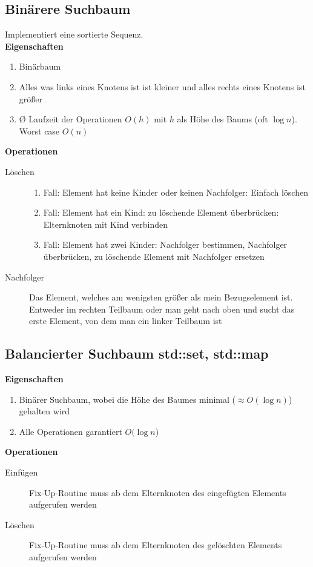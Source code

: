 \subsection{Binärere Suchbaum}
Implementiert eine sortierte Sequenz. \\
\textbf{Eigenschaften}
\begin{enumerate}
    \item Binärbaum
    \item Alles was links eines Knotens ist ist kleiner und alles rechts eines Knotens ist größer
    \item Ø Laufzeit der Operationen $O(h)$ mit $h$ als Höhe des Baums (oft $\log n$). Worst case $O(n)$
\end{enumerate}
\textbf{Operationen}
\begin{description}
    \item[Löschen]
          \begin{enumerate}
              \item Fall: Element hat keine Kinder oder keinen Nachfolger: Einfach löschen
              \item Fall: Element hat ein Kind: zu löschende Element überbrücken: Elternknoten mit Kind verbinden
              \item Fall: Element hat zwei Kinder: Nachfolger bestimmen, Nachfolger überbrücken, zu löschende Element mit Nachfolger ersetzen
          \end{enumerate}
    \item[Nachfolger] Das Element, welches am wenigsten größer als mein Bezugselement ist. Entweder im rechten Teilbaum oder man geht nach oben und sucht das erste Element, von dem man ein linker Teilbaum ist
\end{description}

\subsection{Balancierter Suchbaum std::set, std::map}
\textbf{Eigenschaften}
\begin{enumerate}
    \item Binärer Suchbaum, wobei die Höhe des Baumes minimal ($\approx O(\log n)$) gehalten wird
    \item Alle Operationen garantiert $O(\log n$)
\end{enumerate}

\textbf{Operationen}
\begin{description}
    \item[Einfügen] Fix-Up-Routine muss ab dem Elternknoten des eingefügten Elements aufgerufen werden
    \item[Löschen] Fix-Up-Routine muss ab dem Elternknoten des gelöschten Elements aufgerufen werden
\end{description}

